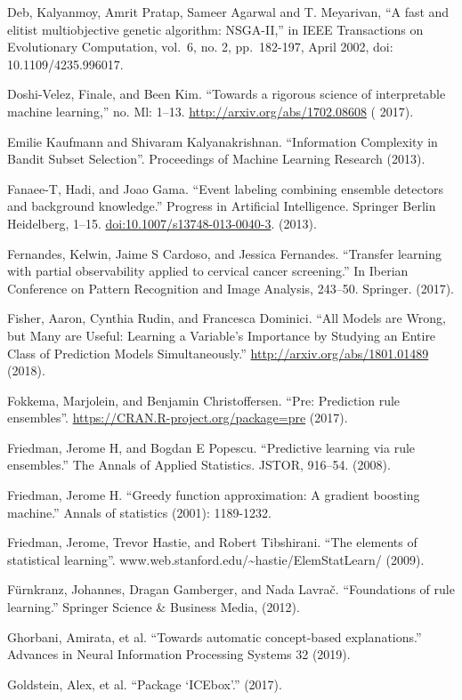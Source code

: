 \documentclass[12pt,]{krantz}
\begin{document}
Deb, Kalyanmoy, Amrit Pratap, Sameer Agarwal and T. Meyarivan, ``A fast
and elitist multiobjective genetic algorithm: NSGA-II,'' in IEEE
Transactions on Evolutionary Computation, vol.~6, no. 2, pp.~182-197,
April 2002, doi: 10.1109/4235.996017.

Doshi-Velez, Finale, and Been Kim. ``Towards a rigorous science of
interpretable machine learning,'' no. Ml: 1--13.
\url{http://arxiv.org/abs/1702.08608} ( 2017).

Emilie Kaufmann and Shivaram Kalyanakrishnan. ``Information Complexity
in Bandit Subset Selection''. Proceedings of Machine Learning Research
(2013).

Fanaee-T, Hadi, and Joao Gama. ``Event labeling combining ensemble
detectors and background knowledge.'' Progress in Artificial
Intelligence. Springer Berlin Heidelberg, 1--15.
\url{doi:10.1007/s13748-013-0040-3}. (2013).

Fernandes, Kelwin, Jaime S Cardoso, and Jessica Fernandes. ``Transfer
learning with partial observability applied to cervical cancer
screening.'' In Iberian Conference on Pattern Recognition and Image
Analysis, 243--50. Springer. (2017).

Fisher, Aaron, Cynthia Rudin, and Francesca Dominici. ``All Models are
Wrong, but Many are Useful: Learning a Variable's Importance by Studying
an Entire Class of Prediction Models Simultaneously.''
\url{http://arxiv.org/abs/1801.01489} (2018).

Fokkema, Marjolein, and Benjamin Christoffersen. ``Pre: Prediction rule
ensembles''. \url{https://CRAN.R-project.org/package=pre} (2017).

Friedman, Jerome H, and Bogdan E Popescu. ``Predictive learning via rule
ensembles.'' The Annals of Applied Statistics. JSTOR, 916--54. (2008).

Friedman, Jerome H. ``Greedy function approximation: A gradient boosting
machine.'' Annals of statistics (2001): 1189-1232.

Friedman, Jerome, Trevor Hastie, and Robert Tibshirani. ``The elements
of statistical learning''.
www.web.stanford.edu/\textasciitilde{}hastie/ElemStatLearn/ (2009).

Fürnkranz, Johannes, Dragan Gamberger, and Nada Lavrač. ``Foundations of
rule learning.'' Springer Science \& Business Media, (2012).

Ghorbani, Amirata, et al. ``Towards automatic concept-based
explanations.'' Advances in Neural Information Processing Systems 32
(2019).

Goldstein, Alex, et al. ``Package `ICEbox'.'' (2017).
\end{document}
